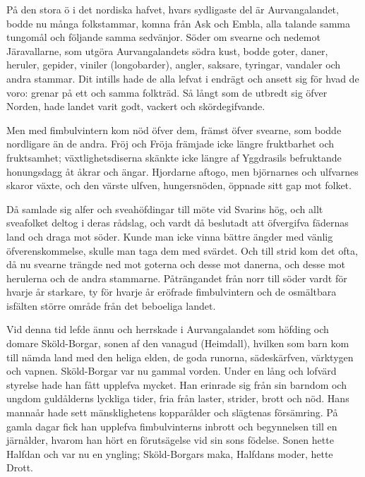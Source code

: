 På den stora ö i det nordiska hafvet, hvars sydligaste del är
Aurvangalandet, bodde nu många folkstammar, komna från Ask och Embla,
alla talande samma tungomål och följande samma sedvänjor. Söder om
svearne och nedemot Järavallarne, som utgöra Aurvangalandets södra kust,
bodde goter, daner, heruler, gepider, viniler (longobarder), angler,
\protect\hypertarget{lb1625905.xhtmlux5cux23start92}{}{}\protect\hypertarget{lb1625905.xhtmlux5cux23start92-a}{}{}\protect\hypertarget{lb1625905.xhtmlux5cux23start92-b}{}{}\protect\hypertarget{lb1625905.xhtmlux5cux23start92-c}{}{}\protect\hypertarget{lb1625905.xhtmlux5cux23start92-d}{}{}
saksare, tyringar, vandaler och andra stammar. Dit intills hade de alla
lefvat i endrägt och ansett sig för hvad de voro: grenar på ett och
samma folkträd. Så långt som de utbredt sig öfver Norden, hade landet
varit godt, vackert och skördegifvande.

Men med fimbulvintern kom nöd öfver dem, främst öfver svearne, som bodde
nordligare än de andra. Fröj och Fröja främjade icke längre fruktbarhet
och fruktsamhet; växtlighetsdiserna skänkte icke längre af Yggdrasils
befruktande honungsdagg åt åkrar och ängar. Hjordarne aftogo, men
björnarnes och ulfvarnes skaror växte, och den värste ulfven,
hungersnöden, öppnade sitt gap mot folket.

Då samlade sig alfer och sveahöfdingar till möte vid Svarins hög, och
allt sveafolket deltog i deras rådslag, och vardt då beslutadt att
öfvergifva fädernas land och draga mot söder. Kunde man icke vinna
bättre ängder med vänlig öfverenskommelse, skulle man taga dem med
svärdet. Och till strid kom det ofta, då nu svearne trängde ned mot
goterna och desse mot danerna, och desse mot herulerna och de andra
stammarne. Påträngandet från norr till söder vardt för hvarje år
starkare, ty för hvarje år eröfrade fimbulvintern och de osmältbara
isfälten större område från det beboeliga landet.

Vid denna tid lefde ännu och herrskade i Aurvangalandet som höfding och
domare Sköld-Borgar, sonen af den vanagud (Heimdall), hvilken som barn
kom till nämda land med den heliga elden, de goda runorna, sädeskärfven,
värktygen och vapnen. Sköld-Borgar var nu gammal vorden. Under en lång
och lofvärd styrelse hade han fått upplefva mycket. Han erinrade sig
från sin barndom och ungdom guldålderns lyckliga tider, fria från
laster, strider, brott och nöd. Hans mannaår hade sett mänsklighetens
kopparålder och slägtenas försämring. På gamla dagar fick han upplefva
fimbulvinterns inbrott och begynnelsen till en järnålder, hvarom han
hört en förutsägelse vid sin sons födelse. Sonen hette Halfdan och var
nu en yngling; Sköld-Borgars maka, Halfdans moder, hette Drott.

